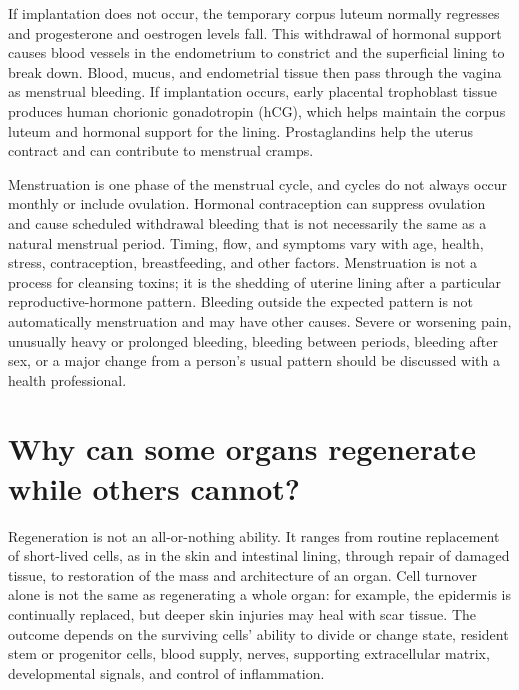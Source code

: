 \documentclass[11pt,oneside]{report}
\begin{document}
If implantation does not occur, the temporary corpus luteum normally regresses
and progesterone and oestrogen levels fall. This withdrawal of hormonal support
causes blood vessels in the endometrium to constrict and the superficial lining
to break down. Blood, mucus, and endometrial tissue then pass through the vagina
as menstrual bleeding. If implantation occurs, early placental trophoblast
tissue produces human chorionic
gonadotropin (hCG), which helps maintain the
corpus luteum and hormonal support for the lining. Prostaglandins help the
uterus contract and can contribute to menstrual cramps.

Menstruation is one phase of the menstrual cycle, and cycles do not always occur
monthly or include ovulation. Hormonal contraception can suppress ovulation and
cause scheduled withdrawal bleeding that is not necessarily the same as a
natural menstrual period. Timing, flow, and
symptoms vary with age, health, stress, contraception, breastfeeding, and other
factors. Menstruation is not a process for cleansing toxins; it is the shedding
of uterine lining after a particular reproductive-hormone pattern. Bleeding
outside the expected pattern is not automatically menstruation and may have
other causes. Severe or worsening pain, unusually heavy or prolonged bleeding,
bleeding between periods, bleeding after sex, or a major change from a person's
usual pattern should be discussed with a health professional.

\section{Why can some organs regenerate while others cannot?}

Regeneration is not an all-or-nothing ability. It ranges from routine
replacement of short-lived cells, as in the skin and intestinal lining, through
repair of damaged tissue, to restoration of the mass and architecture of an
organ. Cell turnover alone is not the same as regenerating a whole organ: for
example, the epidermis is continually replaced, but deeper skin injuries may
heal with scar tissue. The outcome depends on the surviving cells' ability to
divide or change state,
resident stem or progenitor cells, blood supply, nerves, supporting extracellular
matrix, developmental signals, and control of inflammation.
\end{document}
